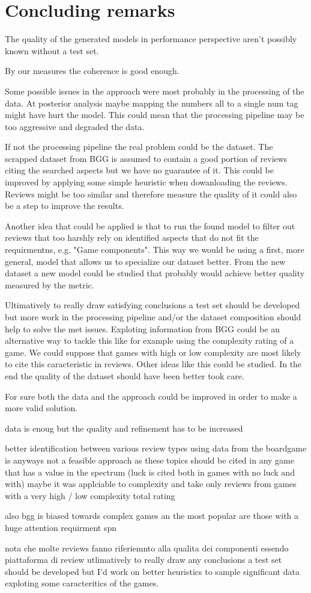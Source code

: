 \section{Concluding remarks}

The quality of the generated models in performance perspective aren't possibly known without a test set.

By our measures the coherence is good enough.

Some possible issues in the approach were most probably in the processing of the data.
At posterior analysis maybe mapping the numbers all to a single num tag might have hurt the model.
This could mean that the processing pipeline may be too aggressive and degraded the data.


If not the processing pipeline the real problem could be the dataset.
The scrapped dataset from BGG is assumed to contain a good portion of reviews citing the searched aspects but
we have no guarantee of it.
This could be improved by applying some simple heuristic when dowanloading the reviews.
Reviews might be too similar and therefore measure the quality of it could also be a step to improve the results.

Another idea that could be applied is that to run the found model to filter out reviews that too harshly rely
on identified aspects that do not fit the requirmentns, e.g. "Game components".
This way we would be using a first, more general, model that allows us to specialize our dataset better.
From the new dataset a new model could be studied that probably would achieve better quality measured by the metric.

Ultimatively to really draw satisfying conclusions a test set should be developed but more work in the
processing pipeline and/or the dataset composition should help to solve the met issues.
Exploting information from BGG could be an alternative way to tackle this like for example using the complexity rating of a game.
We could suppose that games with high or low complexity are most likely to cite this caracteristic in reviews.
Other ideas like this could be studied.
In the end the quality of the dataset should have been better took care.

For sure both the data and the approach could be improved in order to make a more valid solution.

data is enoug but the quality and refinement has to be increased

better identification between various review types
using data from the boardgame is anyways not a feasible approach as these topics should
be cited in any game that has a value in the spectrum (luck is cited both in games with no luck and with)
maybe it was applciable to complexity and take only reviews from games with a very high / low complexity total rating

also bgg is biased towards complex games an the most popular are those with a huge
attention requirment spn

nota che molte reviews fanno riferiemnto alla qualita dei componenti essendo piattaforma di review
utlimatively to really draw any conclusions a test set should be developed but I'd work on
better heuristics to sample significant data exploting some caracteritics of the games.
